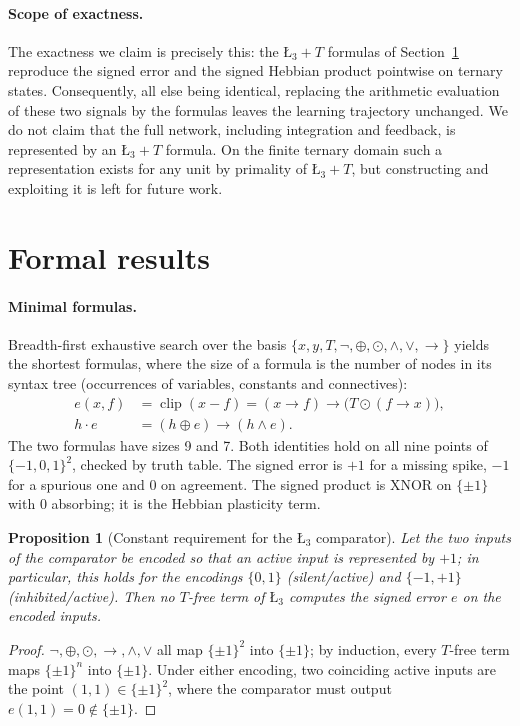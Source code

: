 \documentclass[11pt,a4paper]{article}
\newtheorem{proposition}{Proposition}
\theoremstyle{remark}
\newcommand{\Lt}{\text{\L}_3}
\newcommand{\LtT}{\text{\L}_3{+}T}
\newcommand{\clip}{\operatorname{clip}}
\begin{document}
\paragraph{Scope of exactness.} The exactness we claim is precisely this: the $\LtT$ formulas of Section~\ref{sec:formal} reproduce the signed error and the signed Hebbian product pointwise on ternary states. Consequently, all else being identical, replacing the arithmetic evaluation of these two signals by the formulas leaves the learning trajectory unchanged. We do not claim that the full network, including integration and feedback, is represented by an $\LtT$ formula. On the finite ternary domain such a representation exists for any unit by primality of $\LtT$, but constructing and exploiting it is left for future work.

\section{Formal results}\label{sec:formal}

\paragraph{Minimal formulas.} Breadth-first exhaustive search over the basis $\{x,y,T,\neg,\oplus,\odot,\wedge,\vee,\to\}$ yields the shortest formulas, where the size of a formula is the number of nodes in its syntax tree (occurrences of variables, constants and connectives):
\begin{align}
e(x,f) &= \clip(x-f) = (x\to f)\to\bigl(T\odot(f\to x)\bigr), \label{eq:err}\\
h\cdot e &= (h\oplus e)\to(h\wedge e). \label{eq:prod}
\end{align}
The two formulas have sizes 9 and 7. Both identities hold on all nine points of $\{-1,0,1\}^2$, checked by truth table. The signed error is $+1$ for a missing spike, $-1$ for a spurious one and $0$ on agreement. The signed product is XNOR on $\{\pm1\}$ with $0$ absorbing; it is the Hebbian plasticity term.

\begin{proposition}[Constant requirement for the $\Lt$ comparator]\label{prop:T}
Let the two inputs of the comparator be encoded so that an active input is represented by $+1$; in particular, this holds for the encodings $\{0,1\}$ (silent/active) and $\{-1,+1\}$ (inhibited/active). Then no $T$-free term of $\Lt$ computes the signed error $e$ on the encoded inputs.
\end{proposition}
\begin{proof}
$\neg,\oplus,\odot,\to,\wedge,\vee$ all map $\{\pm1\}^2$ into $\{\pm1\}$; by induction, every $T$-free term maps $\{\pm1\}^n$ into $\{\pm1\}$. Under either encoding, two coinciding active inputs are the point $(1,1)\in\{\pm1\}^2$, where the comparator must output $e(1,1)=0\notin\{\pm1\}$.
\end{proof}
\end{document}
